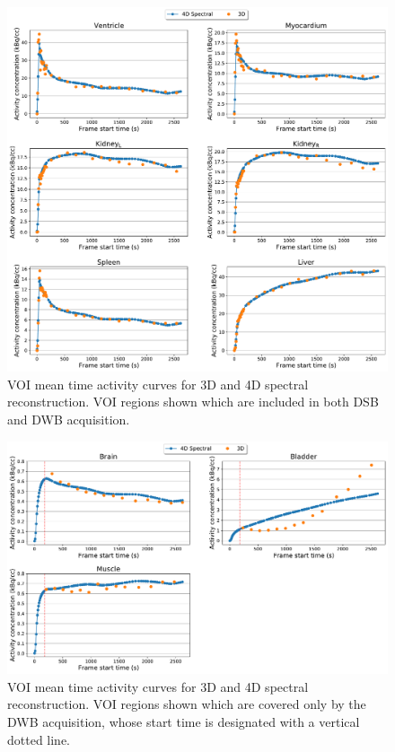 \begin{figure} [ht!]
\centering
\includegraphics[scale=0.5,angle=0]{3_Results/3_3_DWB_Reconstruction/figures/3_3_IsotoPK_CTRL_DWB_3D_vs_4D_central.pdf}
\caption{VOI mean time activity curves for 3D and 4D spectral reconstruction. VOI regions shown which are included in both DSB and DWB acquisition.}
\label{fig_3_3:IsotoPK_CTRL_DWB_4D_vs_3D_Central}
\end{figure}

\begin{figure} [ht!]
\centering
\includegraphics[scale=0.5,angle=0]{3_Results/3_3_DWB_Reconstruction/figures/3_3_IsotoPK_CTRL_DWB_3D_vs_4D_peripheral.pdf}
\caption{VOI mean time activity curves for 3D and 4D spectral reconstruction. VOI regions shown which are covered only by the DWB acquisition, whose start time is designated with a vertical dotted line.}
\label{fig_3_3:IsotoPK_CTRL_DWB_4D_vs_3D_Peripheral}
\end{figure} 

